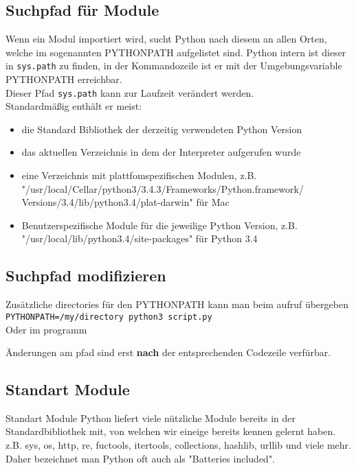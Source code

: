 \begin{frame}
	
	
\end{frame}

\subsection{Suchpfad für Module}
\begin{frame}
	Wenn ein Modul importiert wird, sucht Python nach diesem an allen Orten, welche im sogenannten PYTHONPATH aufgelistet sind. Python intern ist dieser in \texttt{sys.path} zu finden, in der Kommandozeile ist er mit der Umgebungsvariable PYTHONPATH erreichbar.\\
	Dieser Pfad \texttt{sys.path} kann zur Laufzeit verändert werden.\\
	Standardmä\ss{}ig enthält er meist:
	\begin{itemize}
		\item die Standard Bibliothek der derzeitig verwendeten Python Version
		\item das aktuellen Verzeichnis in dem der Interpreter aufgerufen wurde
		\item eine Verzeichnis mit plattfomspezifischen Modulen, z.B.
			"/usr/local/Cellar/python3/3.4.3/Frameworks/Python.framework/
			Versions/3.4/lib/python3.4/plat-darwin" für Mac
		\item Benutzerspezifische Module für die jeweilige Python Version, z.B. "/usr/local/lib/python3.4/site-packages" für Python 3.4
	\end{itemize}
\end{frame}

\subsection{Suchpfad modifizieren}
\begin{frame}
Zusätzliche directories für den PYTHONPATH kann man beim aufruf übergeben\\
\texttt{PYTHONPATH=/my/directory python3 script.py}\\
Oder im programm

Änderungen am pfad sind erst \textbf{nach} der entsprechenden Codezeile verfürbar.
\end{frame}

\subsection{Standart Module}
\begin{frame}{Standart Module}
	Python liefert viele nützliche Module bereits in der Standardbibliothek mit, von welchen wir eineige bereits kennen gelernt haben.
	z.B. sys, os, http, re, fuctools, itertools, collections, hashlib, urllib und viele mehr. Daher bezeichnet man Python oft auch als "Batteries included".
\end{frame}

